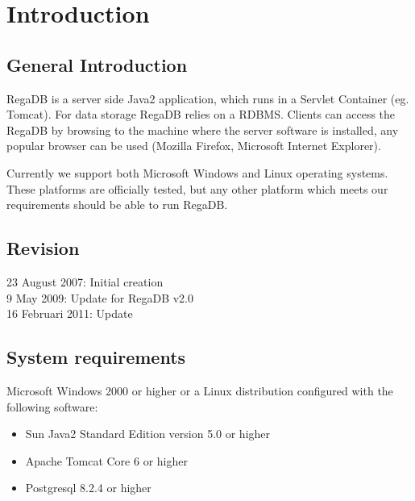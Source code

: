 \chapter{Introduction}
\label{chapter:introduction}

\section{General Introduction}

RegaDB is a server side Java2 application, which runs in a Servlet Container (eg. Tomcat). For data storage RegaDB relies on a RDBMS. Clients can access the RegaDB by browsing to the machine where the server software is installed, any popular browser can be used (Mozilla Firefox, Microsoft Internet Explorer).

Currently we support both Microsoft Windows and Linux operating systems. These platforms are officially tested, but any other platform which meets our requirements should be able to run RegaDB.

\section{Revision}
23 August 2007: Initial creation
\\
9 May 2009: Update for RegaDB v2.0
\\
16 Februari 2011: Update

\section{System requirements}
Microsoft Windows 2000 or higher or a Linux distribution configured with the following software:
\begin{itemize}
\item Sun Java2 Standard Edition version 5.0 or higher
\item Apache Tomcat Core 6 or higher
\item Postgresql 8.2.4 or higher
\end{itemize}
